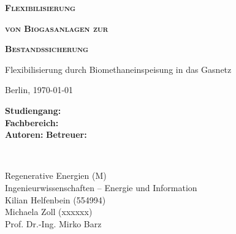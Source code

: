 \begin{titlepage}
	\begin{center}
		
		\vspace*{1cm}
		
		\textbf{\textsc{{\huge Flexibilisierung}}}
		
		\vspace{0.3cm}

		\textbf{\textsc{{\huge von Biogasanlagen zur}}}
		
		\vspace{0.3cm}

		\textbf{\textsc{{\huge Bestandssicherung}}}
 
		\vspace{0.5cm}

		{\Large Flexibilisierung durch Biomethaneinspeisung in das Gasnetz}
 
		\vspace{2cm}
		
		Berlin, \today
       
       
 
		\vfill
 
		\vspace{0.8cm}
 
		\begin{minipage}{0.4\textwidth}
			\begin{flushleft}
				\textbf{Studiengang:}\\
				\textbf{Fachbereich:}\\
				\textbf{Autoren:}\newline\newline
				\textbf{Betreuer:}\\
			\end{flushleft}
		\end{minipage}~
		\begin{minipage}{0.4\textwidth}            
			\begin{flushright}
				Regenerative Energien (M)\\
				Ingenieurwissenschaften – Energie und Information\\
				Kilian Helfenbein (554994)\\
				Michaela Zoll (xxxxxx)\\ 
				Prof. Dr.-Ing. Mirko Barz\\
			\end{flushright}        
		\end{minipage}\\[2 cm]
		
	\end{center}
\end{titlepage}